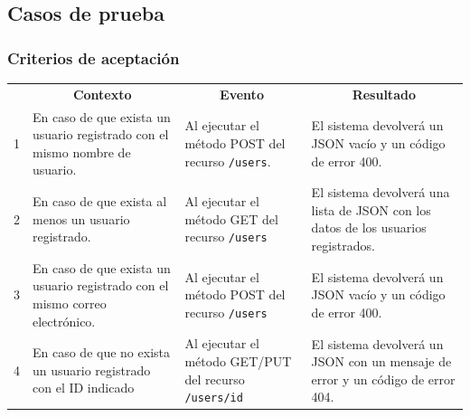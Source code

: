 \clearpage

\subsection{Casos de prueba}
\subsubsection{Criterios de aceptación}

\begin{center}
\begin{longtable}{|m{0.5cm}|m{4cm}|m{4cm}|m{4.5cm}|}
\hline \hline \rowcolor[gray]{0.9}
	\multicolumn{4}{|c|}{\textbf{Criterio de aceptación}} \\
    \hline  \rowcolor[gray]{0.9}
        \multicolumn{1}{|c|}{\textbf{ID}} &
        \multicolumn{1}{c|}{\textbf{Contexto}} &
        \multicolumn{1}{c|}{\textbf{Evento}} &
        \multicolumn{1}{c|}{\textbf{Resultado}} \\
    \hline
1&En caso de que exista un usuario registrado con el mismo nombre de usuario. & Al ejecutar el método POST del recurso \texttt{/users}.  & El sistema devolverá un JSON vacío y un código de error 400. \\ \hline
	\hline
2&En caso de que exista al menos un usuario registrado. & Al ejecutar el método GET del recurso \texttt{/users}  & El sistema devolverá una lista de JSON con los datos de los usuarios registrados. \\ 		\hline
	\hline
3&En caso de que exista un usuario registrado con el mismo correo electrónico. & Al ejecutar el método POST del recurso \texttt{/users}  & El sistema devolverá un JSON vacío y un código de error 400. \\ \hline
    \hline
4&En caso de que no exista un usuario registrado con el ID indicado & Al ejecutar el método GET/PUT del recurso \texttt{/users/id}  & El sistema devolverá un JSON con un mensaje de error y un código de error 404. \\ \hline

  \end{longtable}
\end{center}

